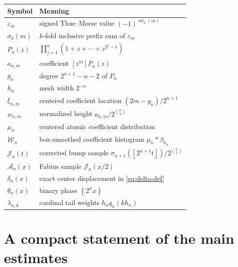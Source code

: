 \documentclass[11pt,oneside]{article}
\theoremstyle{definition}
\theoremstyle{remark}
\newcommand{\wt}{\operatorname{wt}_2}
\newcommand{\floor}[1]{\left\lfloor #1\right\rfloor}
\newcommand{\fracpart}[1]{\left\{#1\right\}}
\begin{document}
\begin{center}
\begin{tabularx}{0.96\textwidth}{@{}l>{\raggedright\arraybackslash}X@{}}
\toprule
Symbol & Meaning\\
\midrule
$\varepsilon_m$ & signed Thue--Morse value $(-1)^{\wt(m)}$\\
$\sigma_k(m)$ & $k$-fold inclusive prefix sum of $\varepsilon_m$\\
$P_n(z)$ & $\prod_{j=1}^n(1+z+\cdots+z^{2^j-1})$\\
$a_{n,m}$ & coefficient $[z^m]P_n(z)$\\
$g_n$ & degree $2^{n+1}-n-2$ of $P_n$\\
$h_n$ & mesh width $2^{-n}$\\
$\xi_{n,m}$ & centered coefficient location $(2m-g_n)/2^{n+1}$\\
$w_{n,m}$ & normalized height $a_{n,m}/2^{\binom n2}$\\
$\mu_n$ & centered atomic coefficient distribution\\
$\mathcal W_n$ & box-smoothed coefficient histogram $\mu_n*\beta_{h_n}$\\
$\mathcal J_n(t)$ & corrected bump sample $\sigma_{n+1}(\floor{2^{n+1}t})/2^{\binom n2}$\\
$\mathcal A_n(x)$ & Fabius sample $\mathcal J_n(x/2)$\\
$\delta_n(x)$ & exact center displacement in \eqref{eq:delta-def}\\
$\theta_n(x)$ & binary phase $\fracpart{2^n x}$\\
$\lambda_{n,k}$ & cardinal tail weights $h_nq_n(kh_n)$\\
\bottomrule
\end{tabularx}
\end{center}

\section{A compact statement of the main estimates}
\label{app:summary}
\end{document}
